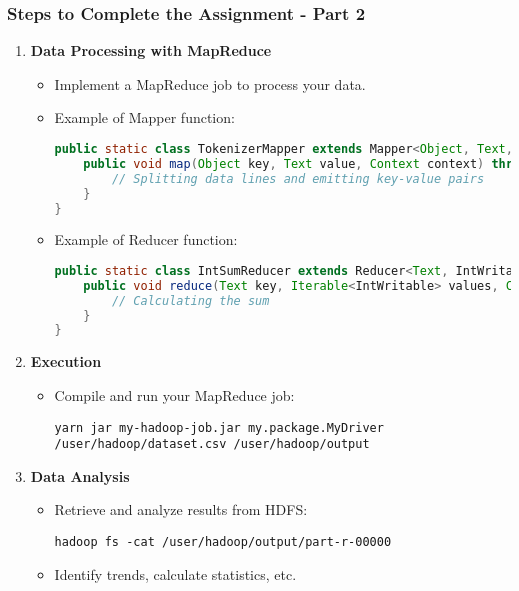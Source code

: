 \documentclass[aspectratio=169]{beamer}
\begin{document}
\begin{frame}[fragile]
    \frametitle{Steps to Complete the Assignment - Part 2}
    \begin{enumerate}[resume]
        \item \textbf{Data Processing with MapReduce}
            \begin{itemize}
                \item Implement a MapReduce job to process your data.
                \item Example of Mapper function:
                \begin{lstlisting}[language=Java]
public static class TokenizerMapper extends Mapper<Object, Text, Text, IntWritable> {
    public void map(Object key, Text value, Context context) throws IOException, InterruptedException {
        // Splitting data lines and emitting key-value pairs
    }
}
                \end{lstlisting}
                \item Example of Reducer function:
                \begin{lstlisting}[language=Java]
public static class IntSumReducer extends Reducer<Text, IntWritable, Text, IntWritable> {
    public void reduce(Text key, Iterable<IntWritable> values, Context context) throws IOException, InterruptedException {
        // Calculating the sum
    }
}
                \end{lstlisting}
            \end{itemize}

        \item \textbf{Execution}
            \begin{itemize}
                \item Compile and run your MapReduce job:
                \begin{lstlisting}[language=Shell]
yarn jar my-hadoop-job.jar my.package.MyDriver /user/hadoop/dataset.csv /user/hadoop/output
                \end{lstlisting}
            \end{itemize}
            
        \item \textbf{Data Analysis}
            \begin{itemize}
                \item Retrieve and analyze results from HDFS:
                \begin{lstlisting}[language=Shell]
hadoop fs -cat /user/hadoop/output/part-r-00000
                \end{lstlisting}
                \item Identify trends, calculate statistics, etc.
            \end{itemize}
    \end{enumerate}
\end{frame}
\end{document}
